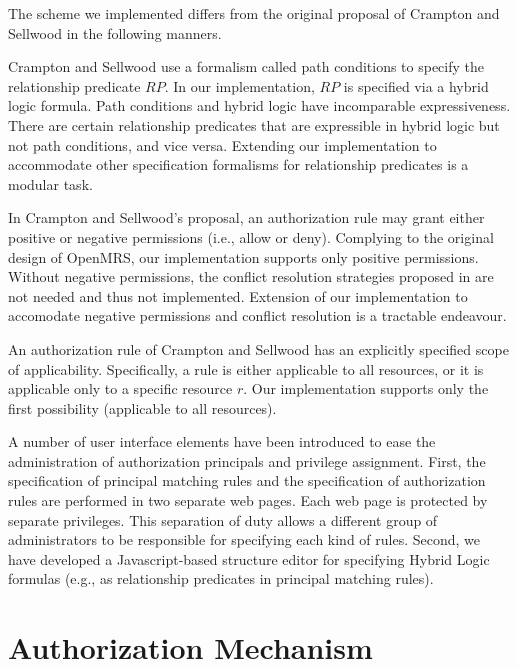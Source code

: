 \documentclass{acm_proc_article-sp}
\begin{document}
The scheme we implemented differs from the original proposal of
Crampton and Sellwood in the following manners.
\begin{compactitem}
\item Crampton and Sellwood use a formalism called path conditions to
  specify the relationship predicate $\mathit{RP}$.  In our
  implementation, $\mathit{RP}$ is specified via a hybrid logic
  formula.  Path conditions and hybrid logic have incomparable
  expressiveness. There are certain relationship predicates that are
  expressible in hybrid logic but not path conditions, and vice versa.
  Extending our implementation to accommodate other specification
  formalisms for relationship predicates is a modular task.
\item In Crampton and Sellwood's proposal, an authorization rule may
  grant either positive or negative permissions (i.e., allow or deny).
  Complying to the original design of OpenMRS, our implementation
  supports only positive permissions.  Without negative permissions,
  the conflict resolution strategies proposed in
  \cite{Crampton-Sellwood:2014} are not needed and thus not
  implemented.  Extension of our implementation to accomodate negative
  permissions and conflict resolution is a tractable endeavour.
\item An authorization rule of Crampton and Sellwood has an explicitly
  specified scope of applicability.  Specifically, a rule is either
  applicable to all resources, or it is applicable only to a specific
  resource $r$.  Our implementation supports only the first 
  possibility (applicable to all resources).
\end{compactitem}

A number of user interface elements have been introduced to ease the
administration of authorization principals and privilege assignment.
First, the specification of principal matching rules and the
specification of authorization rules are performed in two separate web
pages.  Each web page is protected by separate privileges.  This
separation of duty allows a different group of administrators to be
responsible for specifying each kind of rules.  Second, we have
developed a Javascript-based structure editor for specifying Hybrid
Logic formulas (e.g., as relationship predicates in principal 
matching rules).

\section{Authorization Mechanism}
\label{sec-authorization-mechanism}
\end{document}

